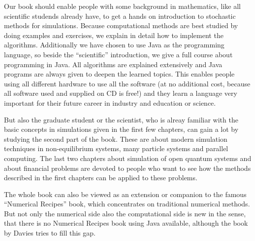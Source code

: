 \documentclass[a4paper]{book}
\begin{document}
 
Our book should enable people with some background in mathematics, like all scientific studends already have, to get a hands on introduction to stochastic methods for simulations.
Because computational methods are best studied by doing examples and exercises, we explain in detail how to implement the algorithms. 
Additionally we have chosen to use Java as the programming language, so beside the ``scientific'' introduction, we give a full course about programming in Java.
All algorithms are explained extensively and Java programs are always given to deepen the learned topics.
This enables people using all different hardware to use all the software (at no additional cost, because all software used and supplied on CD is free!) and they learn a language very important for their future career in industry and education or science.

But also the graduate student or the scientist, who is alreay familiar with the basic concepts in simulations given in the first few chapters, can gain a lot by studying the second part of the book.
These are about modern simulation techniques in non-equilibrium systems, many particle systems and parallel computing.
The last two chapters about simulation of open quantum systems and about financial problems are devoted to people who want to see how the methods described in the first chapters can be applied to these problems.

The whole book can also be viewed as an extension or companion to the famous ``Numerical Recipes'' book, which concentrates on traditional numerical methods.
But not only the numerical side also the computational side is new in the sense, that there is no Numerical Recipes book using Java available, although the book by Davies tries to fill this gap.
\end{document}
